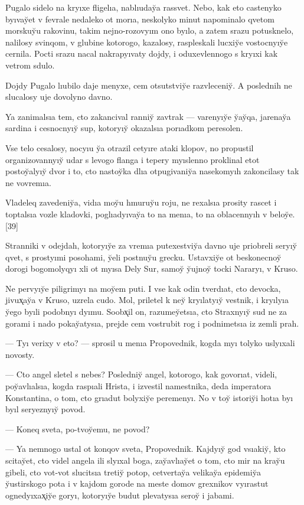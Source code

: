 \documentclass[10pt]{book}
\begin{document}
Pugalo sidelo na kryıxe fligelıa, nablıuday̆a rassvet. Nebo, kak eto castenyko byıvay̆et v fevrale nedaleko ot morıa, neskolyko minut napominalo qvetom morskuy̆u rakovinu, takim nejno-rozovyım ono byılo, a zatem srazu potusknelo, nalilosy svinqom, v glubine kotorogo, kazalosy, raspleskali lucxiy̆e vostocnyıy̆e cernila. Pocti srazu nacal nakrapyıvaty dojdy, i oduxevlennogo s kryıxi kak vetrom sdulo.

Dojdy Pugalo lıubilo daje menyxe, cem otsutstviy̆e razvleceniy̆. A poslednih ne slucalosy uje dovolyno davno.

Ya zanimalsıa tem, cto zakancival ranniy̆ zavtrak — varenyıy̆e y̆ay̆qa, jarenay̆a sardina i cesnocnyıy̆ sup, kotoryıy̆ okazalsıa porıadkom peresolen.

Vse telo cesalosy, nocyıu y̆a otrazil cetyıre ataki klopov, no propustil organizovannyıy̆ udar s levogo flanga i tepery myıslenno proklinal etot postoy̆alyıy̆ dvor i to, cto nastoy̆ka dlıa otpugivaniy̆a nasekomyıh zakoncilasy tak ne vovremıa.

Vladeleq zavedeniy̆a, vidıa moy̆u hmuruy̆u roju, ne rexalsıa prosity rascet i toptalsıa vozle kladovki, poglıadyıvay̆a to na menıa, to na oblacennyıh v beloy̆e.[39]

Stranniki v odejdah, kotoryıy̆e za vremıa putexestviy̆a davno uje priobreli seryıy̆ qvet, s prostyımi posohami, y̆eli postnuy̆u grecku. Ustavxiy̆e ot beskonecnoy̆ dorogi bogomolyqyı xli ot myısa Dely Sur, samoy̆ y̆ujnoy̆ tocki Nararyı, v Kruso.

Ne pervyıy̆e piligrimyı na moy̆em puti. I vse kak odin tverdıat, cto devocka, jivux̨ay̆a v Kruso, uzrela cudo. Mol, priletel k ney̆ kryılatyıy̆ vestnik, i kryılyıa y̆ego byıli podobnyı dyımu. Soobx̨il on, razumey̆etsıa, cto Straxnyıy̆ sud ne za gorami i nado pokay̆atysıa, prejde cem vostrubit rog i podnimetsıa iz zemli prah.

— Tyı verixy v eto? — sprosil u menıa Propovednik, kogda myı tolyko uslyıxali novosty.

— Cto angel sletel s nebes? Posledniy̆ angel, kotorogo, kak govorıat, videli, poy̆avlıalsıa, kogda raspıali Hrista, i izvestil namestnika, deda imperatora Konstantina, o tom, cto grıadut bolyxiy̆e peremenyı. No v toy̆ istoriy̆i hotıa byı byıl seryeznyıy̆ povod.

— Koneq sveta, po-tvoy̆emu, ne povod?

— Ya nemnogo ustal ot konqov sveta, Propovednik. Kajdyıy̆ god vsıakiy̆, kto scitay̆et, cto videl angela ili slyıxal boga, zay̆avlıay̆et o tom, cto mir na kray̆u gibeli, cto vot-vot slucitsıa tretiy̆ potop, cetvertay̆a velikay̆a epidemiy̆a y̆ustirskogo pota i v kajdom gorode na meste domov grexnikov vyırastut ognedyıxax̨iy̆e goryı, kotoryıy̆e budut plevatysıa seroy̆ i jabami.
\end{document}
